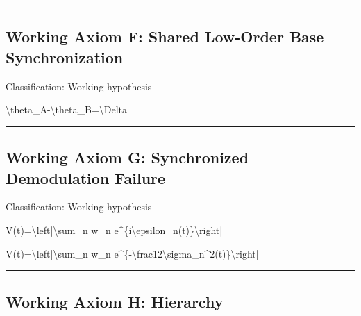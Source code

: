 \documentclass[
  a4paper]{article}
\newenvironment{Shaded}{}{}
\newcommand{\NormalTok}[1]{#1}
\begin{document}
\begin{center}\rule{0.5\linewidth}{0.5pt}\end{center}

\subsection{Working Axiom F: Shared Low-Order Base
Synchronization}\label{working-axiom-f-shared-low-order-base-synchronization}

Classification: Working hypothesis

\begin{Shaded}
\begin{Highlighting}[]
\NormalTok{\textbackslash{}theta\_A{-}\textbackslash{}theta\_B=\textbackslash{}Delta}
\end{Highlighting}
\end{Shaded}

\begin{center}\rule{0.5\linewidth}{0.5pt}\end{center}

\subsection{Working Axiom G: Synchronized Demodulation
Failure}\label{working-axiom-g-synchronized-demodulation-failure}

Classification: Working hypothesis

\begin{Shaded}
\begin{Highlighting}[]
\NormalTok{V(t)=\textbackslash{}left|\textbackslash{}sum\_n w\_n e\^{}\{i\textbackslash{}epsilon\_n(t)\}\textbackslash{}right|}
\end{Highlighting}
\end{Shaded}

\begin{Shaded}
\begin{Highlighting}[]
\NormalTok{V(t)=\textbackslash{}left|\textbackslash{}sum\_n w\_n e\^{}\{{-}\textbackslash{}frac12\textbackslash{}sigma\_n\^{}2(t)\}\textbackslash{}right|}
\end{Highlighting}
\end{Shaded}

\begin{center}\rule{0.5\linewidth}{0.5pt}\end{center}

\subsection{Working Axiom H: Hierarchy}\label{working-axiom-h-hierarchy}
\end{document}
